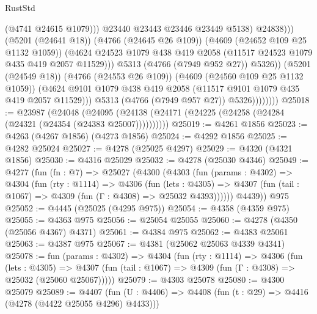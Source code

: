 \begin{lexlean}{RustStd}
\begin{coremodule}
                                        (@4741 @24615 @1079)))
                                    @23440
                                    @23443
                                    @23446
                                    @23449
                                    @5138)
                                  @24838)))
                            (@5201 (@24641 @18))
                            (@4766 (@24645 @26 @109))
                            (@4609 (@24652 @109 @25 @1132 @1059))
                            (@4624
                              @24523
                              @1079
                              @438
                              @419
                              @2058
                              (@11517 @24523 @1079 @435 @419 @2057 @11529)))
                          @5313
                          (@4766 (@7949 @952 @27))
                          @5326))
                      (@5201 (@24549 @18))
                      (@4766 (@24553 @26 @109))
                      (@4609 (@24560 @109 @25 @1132 @1059))
                      (@4624
                        @9101
                        @1079
                        @438
                        @419
                        @2058
                        (@11517 @9101 @1079 @435 @419 @2057 @11529)))
                    @5313
                    (@4766 (@7949 @957 @27))
                    @5326))))))))
@25018 := @23987
    (@24048 (@24095 (@24138 (@24171 (@24225 (@24258 (@24284 (@24321 (@24354 (@24383 @25007))))))))))
@25019 := @4261 @1856
@25023 := @4263 (@4267 @1856) (@4273 @1856)
@25024 := @4292 @1856
@25025 := @4282 @25024
@25027 := @4278 (@25025 @4297)
@25029 := @4320 (@4321 @1856)
@25030 := @4316 @25029
@25032 := @4278 (@25030 @4346)
@25049 := @4277
    (fun (fn : @7) =>
    @25027
      (@4300
        (@4303
          (fun (params : @4302) =>
          @4304
            (fun (rty : @1114) =>
            @4306
              (fun (lets : @4305) =>
              @4307 (fun (tail : @1067) => @4309 (fun (Γ : @4308) => @25032 @4393))))))
        @4439))
    @975
@25052 := @4445 (@25025 (@4295 @975))
@25054 := @4358 (@4359 @975)
@25055 := @4363 @975
@25056 := @25054 @25055
@25060 := @4278 (@4350 (@25056 @4367) @4371)
@25061 := @4384 @975
@25062 := @4383 @25061
@25063 := @4387 @975
@25067 := @4381 (@25062 @25063 @4339 @4341)
@25078 := fun (params : @4302) =>
  @4304
    (fun (rty : @1114) =>
    @4306
      (fun (lets : @4305) =>
      @4307 (fun (tail : @1067) => @4309 (fun (Γ : @4308) => @25032 (@25060 @25067)))))
@25079 := @4303 @25078
@25080 := @4300 @25079
@25089 := @4407
    (fun (U : @4406) => @4408 (fun (t : @29) => @4416 (@4278 (@4422 @25055 @4296) @4433)))

\end{coremodule}
\end{lexlean}
